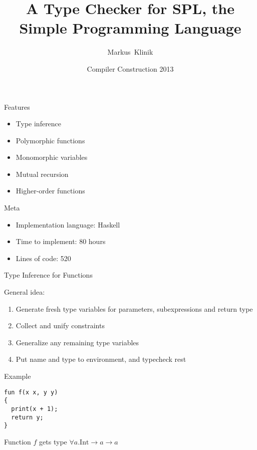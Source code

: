 \documentclass{beamer}
\title
{A Type Checker for SPL, the Simple Programming Language}
\author
{Markus~Klinik}
\institute[Radboud University Nijmegen]
{
  Radboud University Nijmegen
}
\date
{Compiler Construction 2013}
\newcommand{\arr}{\rightarrow}
\begin{document}
\begin{frame}
  \titlepage
\end{frame}

\begin{frame}{Features}

  \begin{itemize}
    \item Type inference
    \item Polymorphic functions
    \item Monomorphic variables
    \item Mutual recursion
    \item Higher-order functions
  \end{itemize}

\end{frame}

\begin{frame}{Meta}

  \begin{itemize}
    \item Implementation language: Haskell
    \item Time to implement: 80 hours
    \item Lines of code: 520
  \end{itemize}

\end{frame}


\begin{frame}{Type Inference for Functions}

General idea:

  \begin{enumerate}
    \item Generate fresh type variables for parameters, subexpressions
    and return type
    \item Collect and unify constraints
    \item Generalize any remaining type variables
    \item Put name and type to environment, and typecheck rest
  \end{enumerate}

\end{frame}


\begin{frame}[fragile]{Example}

\begin{verbatim}
fun f(x x, y y)
{
  print(x + 1);
  return y;
}
\end{verbatim}

Function $f$ gets type $\forall a . \text{Int} \arr a \arr a$

\end{frame}
\end{document}
